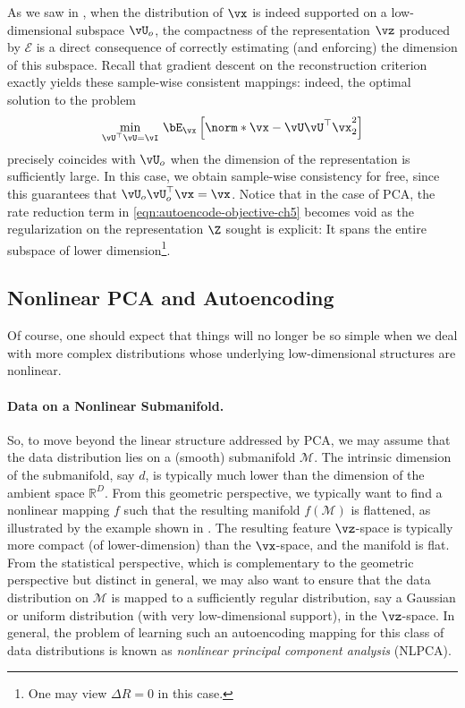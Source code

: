 \documentclass[../../book-main.tex]{subfiles}
\begin{document}
As we saw in , when the distribution of $\vx$ is indeed
supported on a low-dimensional subspace $\vU_o$, the compactness of
the representation
$\vz$ produced by $\mathcal{E}$ is a direct consequence of correctly
estimating (and enforcing) the dimension of this subspace.
Recall that gradient descent on the reconstruction criterion exactly
yields these sample-wise consistent mappings: indeed, the optimal
solution to the problem
\begin{equation}\label{eq:pca-reconstruction-ch5}
    \min_{\vU^\top \vU = \vI}\, \bE_{\vx}\left[\norm*{\vx
    - \vU\vU^\top \vx}_2^2\right]
\end{equation}
precisely coincides with $\vU_o$ when the dimension of the representation is
sufficiently large. In this case, we obtain sample-wise consistency
for free, since this guarantees that $\vU_o\vU_o^\top \vx = \vx$.
Notice that in the case of PCA, the rate reduction term in
\eqref{eqn:autoencode-objective-ch5} becomes void as the regularization
on the representation $\Z$ sought is explicit: It spans the entire
subspace of lower dimension\footnote{One may view $\Delta R = 0$ in this case.}.

\subsection{Nonlinear PCA and
Autoencoding}\label{sub:nonlinear-pca}\label{sec:NLPCA}
Of course, one should expect that things will no longer be so simple
when we deal with more complex distributions whose underlying
low-dimensional structures are nonlinear.

\paragraph{Data on a Nonlinear Submanifold.} So, to move beyond the
linear structure addressed by PCA, we may assume that the data
distribution lies on a (smooth) submanifold $\mathcal{M}$. The
intrinsic dimension of the submanifold, say $d$, is typically much
lower than the
dimension of the ambient space $\mathbb{R}^D$. From this geometric
perspective, we typically want to find a nonlinear mapping $f$ such that
the resulting manifold
$f(\mathcal{M})$ is flattened, as illustrated by the example shown in
. The resulting feature $\vz$-space
is typically
more compact (of lower-dimension) than the $\vx$-space, and the
manifold is flat.
From the statistical perspective, which is complementary to the geometric
perspective but distinct in general, we may also want to ensure that the data
distribution on $\mathcal{M}$ is mapped to a sufficiently regular
distribution, say a Gaussian or uniform distribution (with
very low-dimensional support), in the $\vz$-space.
In general, the problem of learning such an autoencoding mapping for this class
of data distributions is known as {\em nonlinear principal component analysis}
(NLPCA).
\end{document}
